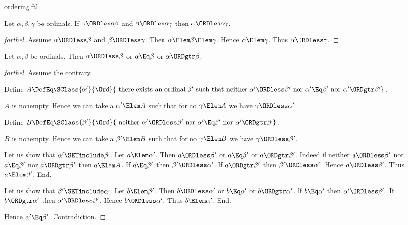 \documentclass{stex}
\begin{document}
\begin{smodule}{ordering.ftl}
\begin{proposition}[forthel]
  Let $\alpha, \beta, \gamma$ be ordinals.
  If $\alpha \ORDless \beta$ and $\beta \ORDless \gamma$ then $\alpha \ORDless \gamma$.
\end{proposition}
\begin{proof}[forthel]
  Assume $\alpha \ORDless \beta$ and $\beta \ORDless \gamma$.
  Then $\alpha \Elem \beta \Elem \gamma$.
  Hence $\alpha \Elem \gamma$.
  Thus $\alpha \ORDless \gamma$.
\end{proof}

\begin{proposition}[forthel]
  Let $\alpha, \beta$ be ordinals.
  Then $\alpha \ORDless \beta$ or $\alpha \Eq \beta$ or $\alpha \ORDgtr \beta$.
\end{proposition}
\begin{proof}[forthel]
  Assume the contrary.
  
  Define $A \DefEq \SClass{\alpha'}{\Ord}{\text{ there exists an ordinal }\beta'\text{ such that neither }\alpha' \ORDless \beta'\text{ nor }\alpha' \Eq \beta'\text{ nor }\alpha' \ORDgtr \beta'}$.
  
  $A$ is nonempty.
  Hence we can take a $\alpha' \Elem A$ such that for no $\gamma \Elem A$ we have $\gamma \ORDless \alpha'$.
  
  Define $B \DefEq \SClass{\beta'}{\Ord}{\text{ neither }\alpha' \ORDless \beta'\text{ nor }\alpha' \Eq \beta'\text{ nor }\alpha' \ORDgtr \beta'}$.
  
  $B$ is nonempty.
  Hence we can take a $\beta' \Elem B$ such that for no $\gamma \Elem B$ we have $\gamma \ORDless \beta'$.

  Let us show that $\alpha' \SETinclude \beta'$.
    Let $a \Elem \alpha'$.
    Then $a \ORDless \beta'$ or $a \Eq \beta'$ or $a \ORDgtr \beta'$.
    Indeed if neither $a \ORDless \beta'$ nor $a \Eq \beta'$ nor $a \ORDgtr \beta'$ then
    $a \Elem A$.
    If $a \Eq \beta'$ then $\beta' \ORDless \alpha'$.
    If $a \ORDgtr \beta'$ then $\beta' \ORDless \alpha'$.
    Hence $a \ORDless \beta'$.
    Thus $a \Elem \beta'$.
  End.

  Let us show that $\beta' \SETinclude \alpha'$.
    Let $b \Elem \beta'$.
    Then $b \ORDless \alpha'$ or $b \Eq \alpha'$ or $b \ORDgtr \alpha'$.
    If $b \Eq \alpha'$ then $\alpha' \ORDless \beta'$.
    If $b \ORDgtr \alpha'$ then $\alpha' \ORDless \beta'$.
    Hence $b \ORDless \alpha'$.
    Thus $b \Elem \alpha'$.
  End.

  Hence $\alpha' \Eq \beta'$.
  Contradiction.
\end{proof}


\end{smodule}
\end{document}
